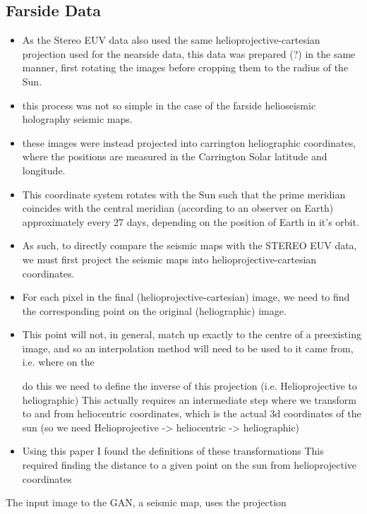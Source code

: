 \documentclass[11pt,a4paper,onecolumn]{report}
\begin{document}
\subsection{Farside Data}
\begin{itemize}
  \item As the Stereo EUV data also used the same helioprojective-cartesian
  projection used for the nearside data, this data was prepared (?) in the same
  manner, first rotating the images before cropping them to the radius of the
  Sun.
  \item this process was not so simple in the case of the farside helioseismic
  holography seismic maps.
  \item these images were instead projected into carrington heliographic
  coordinates, where the positions are measured in the Carrington Solar latitude
  and longitude.
  \item This coordinate system rotates with the Sun such that the prime meridian
  coincides with the central meridian (according to an observer on Earth)
  approximately every 27 days, depending on the position of Earth in it's orbit.
  \item As such, to directly compare the seismic maps with the STEREO EUV
  data, we must first project the seismic maps into helioprojective-cartesian
  coordinates.

  \item For each pixel in the final (helioprojective-cartesian) image, we need
  to find the corresponding point on the original (heliographic) image.
  \item This point will not, in general, match up exactly to the centre of a
  preexisting image, and so an interpolation method will need to be used to  it came from, i.e. where on the 
  
  
  do this we need to define the inverse of this projection (i.e.
  Helioprojective to heliographic) This actually requires an intermediate step
  where we transform to and from heliocentric coordinates, which is the actual
  3d coordinates of the sun (so we need Helioprojective -> heliocentric ->
  heliographic)
  \item Using this paper I found the definitions of these
  transformations This required finding the distance to a given point on the sun
  from helioprojective coordinates

\end{itemize}


The input image to the GAN, a seismic map,
uses the projection
\end{document}
